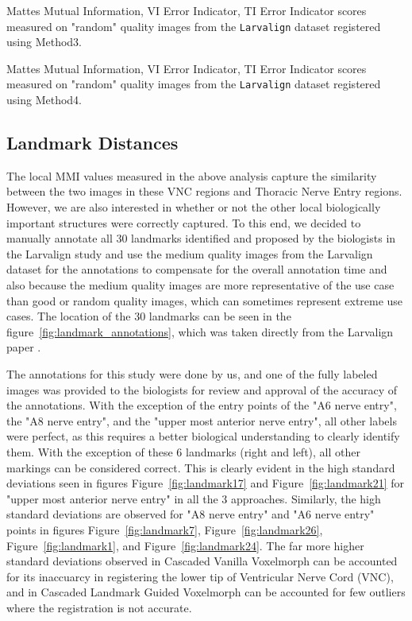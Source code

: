 \documentclass{report}
\begin{document}
	\begin{table}[H]
		\centering
		
		\caption{Mattes Mutual Information, VI Error Indicator, TI Error Indicator scores measured on "random" quality images from the \texttt{Larvalign} dataset registered using Method3.}
		\label{table:quality_vanilla_random}
	\end{table}

	\begin{table}[H]
		\centering
		
		\caption{Mattes Mutual Information, VI Error Indicator, TI Error Indicator scores measured on "random" quality images from the \texttt{Larvalign} dataset registered using Method4.}
		\label{table:quality_ldm_random}
	\end{table}

	\subsection{Landmark Distances}
	The local MMI values measured in the above analysis capture the similarity between the two images in these VNC regions and Thoracic Nerve Entry regions. However, we are also interested in whether or not the other local biologically important structures were correctly captured. To this end, we decided to manually annotate all 30 landmarks identified and proposed by the biologists in the Larvalign study and use the medium quality images from the Larvalign dataset for the annotations to compensate for the overall annotation time and also because the medium quality images are more representative of the use case than good or random quality images, which can sometimes represent extreme use cases. The location of the 30 landmarks can be seen in the figure~\ref{fig:landmark_annotations}, which was taken directly from the Larvalign paper \cite{larvalign}.
	
	The annotations for this study were done by us, and one of the fully labeled images was provided to the biologists for review and approval of the accuracy of the annotations. With the exception of the entry points of the "A6 nerve entry", the "A8 nerve entry", and the "upper most anterior nerve entry", all other labels were perfect, as this requires a better biological understanding to clearly identify them. With the exception of these 6 landmarks (right and left), all other markings can be considered correct. This is clearly evident in the high standard deviations seen in figures Figure~\ref{fig:landmark17} and Figure~\ref{fig:landmark21} for "upper most anterior nerve entry" in all the 3 approaches. Similarly, the high standard deviations are observed for "A8 nerve entry" and "A6 nerve entry" points in figures Figure~\ref{fig:landmark7}, Figure~\ref{fig:landmark26}, Figure~\ref{fig:landmark1}, and Figure~\ref{fig:landmark24}. The far more higher standard deviations observed in Cascaded Vanilla Voxelmorph can be accounted for its inaccuarcy in registering the lower tip of Ventricular Nerve Cord (VNC), and in Cascaded Landmark Guided Voxelmorph can be accounted for few outliers where the registration is not accurate.
	
\end{document}
